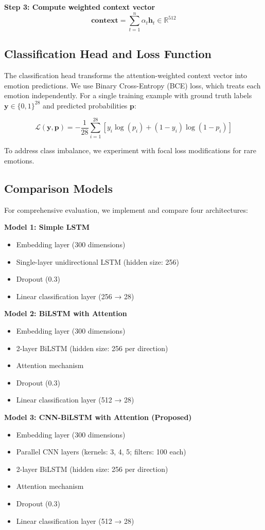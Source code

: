 \documentclass[12pt,a4paper]{article}
\begin{document}
\textbf{Step 3: Compute weighted context vector}
$$\mathbf{context} = \sum_{t=1}^{n} \alpha_t \mathbf{h}_t \in \mathbb{R}^{512}$$

\subsection{Classification Head and Loss Function}

The classification head transforms the attention-weighted context vector into emotion predictions. We use Binary Cross-Entropy (BCE) loss, which treats each emotion independently. For a single training example with ground truth labels $\mathbf{y} \in \{0,1\}^{28}$ and predicted probabilities $\mathbf{p}$:

$$\mathcal{L}(\mathbf{y}, \mathbf{p}) = -\frac{1}{28} \sum_{i=1}^{28} [y_i \log(p_i) + (1-y_i) \log(1-p_i)]$$

To address class imbalance, we experiment with focal loss modifications \cite{lin2020focal} for rare emotions.

\subsection{Comparison Models}

For comprehensive evaluation, we implement and compare four architectures:

\textbf{Model 1: Simple LSTM}
\begin{itemize}
    \item Embedding layer (300 dimensions)
    \item Single-layer unidirectional LSTM (hidden size: 256)
    \item Dropout (0.3)
    \item Linear classification layer (256 → 28)
\end{itemize}

\textbf{Model 2: BiLSTM with Attention}
\begin{itemize}
    \item Embedding layer (300 dimensions)
    \item 2-layer BiLSTM (hidden size: 256 per direction)
    \item Attention mechanism
    \item Dropout (0.3)
    \item Linear classification layer (512 → 28)
\end{itemize}

\textbf{Model 3: CNN-BiLSTM with Attention (Proposed)}
\begin{itemize}
    \item Embedding layer (300 dimensions)
    \item Parallel CNN layers (kernels: 3, 4, 5; filters: 100 each)
    \item 2-layer BiLSTM (hidden size: 256 per direction)
    \item Attention mechanism
    \item Dropout (0.3)
    \item Linear classification layer (512 → 28)
\end{itemize}
\end{document}
